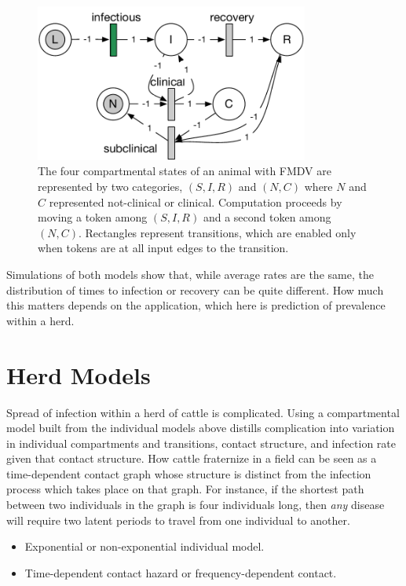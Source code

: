 \documentclass{article}
\begin{document}
\begin{figure}
\centerline{\includegraphics[width=9cm]{individual_gspn}}
\caption{The four compartmental states of an animal with FMDV
are represented by two categories, $(S,I,R)$ and $(N,C)$
where $N$ and $C$ represented not-clinical or clinical.
Computation proceeds by moving a token among $(S,I,R)$ and a
second token among $(N,C)$. Rectangles represent transitions,
which are enabled only when tokens are at all input edges to the
transition.\label{fig:individual_gspn}}
\end{figure}%

Simulations of both models show that, while average rates
are the same, the distribution
of times to infection or recovery can be quite different.
How much this matters depends on the application, which
here is prediction of prevalence within a herd.

\section{Herd Models}
Spread of infection within a herd of cattle is complicated.
Using a compartmental model built from the individual
models above distills complication into variation in
individual compartments and transitions, contact structure,
and infection rate given that contact structure.
How cattle fraternize in a field can be seen as a
time-dependent contact graph whose structure is 
distinct from the infection process which takes place
on that graph. For instance, if the shortest path between
two individuals in the graph is four individuals long, then
\emph{any\/} disease will require two latent periods
to travel from one individual to another.

\begin{itemize}
  \item Exponential or non-exponential individual model.
  \item Time-dependent contact hazard or frequency-dependent contact.
\end{itemize}



\end{document}
